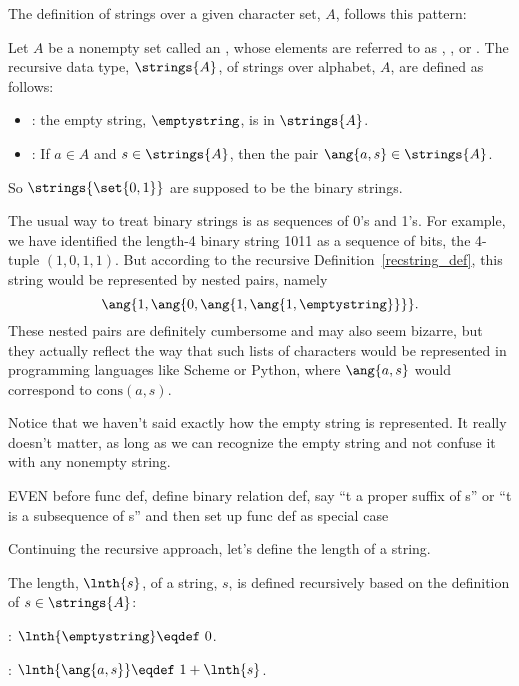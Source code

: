 The definition of strings over a given character set, $A$, follows this
pattern:

\begin{definition}\label{recstring_def}
  Let $A$ be a nonempty set called an , whose elements are
  referred to as , , or .
  The recursive data type, $\strings{A}$, of strings over alphabet, $A$,
  are defined as follows:
\begin{itemize}
\item {}: the empty string, $\emptystring$, is in $\strings{A}$.

\item {}: If $a \in A$ and $s \in \strings{A}$, then the pair
       $\ang{a,s} \in \strings{A}$.
\end{itemize}
\end{definition}
So $\strings{\set{0,1}}$ are supposed to be the binary strings.

The usual way to treat binary strings is as sequences of 0's and 1's.
For example, we have identified the length-4 binary string 1011 as a
sequence of bits, the 4-tuple $(1,0,1,1)$.  But according to
the recursive Definition~\ref{recstring_def}, this string would be
represented by nested pairs, namely
\[
\ang{1,\ang{0,\ang{1,\ang{1,\emptystring}}}}.
\]
These nested pairs are definitely cumbersome and may also seem
bizarre, but they actually reflect the way that such lists of
characters would be represented in programming languages like Scheme
or Python, where $\ang{a,s}$ would correspond to $\text{cons}(a, s)$.

Notice that we haven't said exactly how the empty string is
represented.  It really doesn't matter, as long as we can recognize
the empty string and not confuse it with any nonempty string.

\begin{editingnotes}
EVEN before func def, define binary relation def, say ``t a proper
suffix of s'' or ``t is a subsequence of s'' and then set up func def
as special case
\end{editingnotes}

Continuing the recursive approach, let's define the length of a string.
\begin{definition}
The length, $\lnth{s}$, of a string, $s$, is defined recursively
based on the definition of $s \in \strings{A}$:

\item {}:  $\lnth{\emptystring} \eqdef\ 0$.

\item {}: $\lnth{\ang{a,s}} \eqdef\ 1 + \lnth{s}$.

\end{definition}

